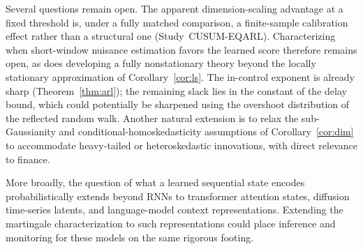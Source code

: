 \documentclass[bj,authoryear]{imsart}
\theoremstyle{plain}
\theoremstyle{definition}
\begin{document}
Several questions remain open. The apparent dimension-scaling advantage at a fixed threshold is, under a fully matched comparison, a finite-sample calibration effect rather than a structural one (Study~CUSUM-EQARL). Characterizing when short-window nuisance estimation favors the learned score therefore remains open, as does developing a fully nonstationary theory beyond the locally stationary approximation of Corollary~\ref{cor:ls}. The in-control exponent is already sharp (Theorem~\ref{thm:arl}); the remaining slack lies in the constant of the delay bound, which could potentially be sharpened using the overshoot distribution of the reflected random walk. Another natural extension is to relax the sub-Gaussianity and conditional-homoskedasticity assumptions of Corollary~\ref{cor:dim} to accommodate heavy-tailed or heteroskedastic innovations, with direct relevance to finance.

More broadly, the question of what a learned sequential state encodes probabilistically extends beyond RNNs to transformer attention states, diffusion time-series latents, and language-model context representations. Extending the martingale characterization to such representations could place inference and monitoring for these models on the same rigorous footing.




\end{document}
